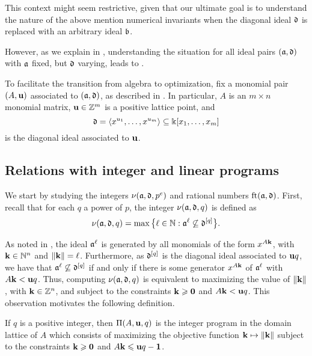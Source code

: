 \documentclass[11pt]{amsart}
\begin{document}
\begin{remark}
This context might seem restrictive, given that our ultimate goal is to understand the nature of the above mention numerical invariants when the diagonal ideal $\mathfrak{d}$ is replaced with an arbitrary ideal $\mathfrak{b}$.  

However, as we explain in , understanding the situation for all ideal pairs $(\mathfrak{a}, \mathfrak{d})$ with $\mathfrak{a}$ fixed, but $\mathfrak{d}$ varying, leads to .
\end{remark}

To facilitate the transition from algebra to optimization, fix a monomial pair $(A, \mathbf{u})$ associated to $(\mathfrak{a}, \mathfrak{d})$, as described in .  In particular, $A$ is an $m \times n$ monomial matrix, $\mathbf{u} \in \mathbb{Z}^m$ is a positive lattice point, and 
\[ \mathfrak{d} = \langle x^{u_1}, \ldots, x^{u_{m}} \rangle \subseteq \Bbbk[x_1, \ldots, x_{m}] \] is the diagonal ideal associated to $\mathbf{u}$.

\subsection{Relations with integer and linear programs}  We start by studying the integers $\nu(\mathfrak{a}, \mathfrak{d}, p^e)$ and rational numbers $\operatorname{ft}(\mathfrak{a}, \mathfrak{d})$.  First, recall that for each $q$ a power of $p$, the integer $\nu(\mathfrak{a}, \mathfrak{d}, q)$ is defined as 
\[\nu(\mathfrak{a},\mathfrak{d},q) = \max\big\{\ell \in \mathbb{N} : \mathfrak{a}^{\ell} \not\subseteq \mathfrak{d}^{[q]}\big\}.\]

As noted in ,  the ideal $\mathfrak{a}^{\ell}$ is generated by all monomials of the form $x^{A\mathbf{k}}$, with $\mathbf{k}\in \mathbb{N}^n$ and $\| \mathbf{k} \| = \ell$.  Furthermore, as $\mathfrak{d}^{[q]}$ is the diagonal ideal associated to $\mathbf{u}q$, we have that $\mathfrak{a}^{\ell} \not\subseteq \mathfrak{d}^{[q]}$ if and only if there is some generator $x^{A \mathbf{k}}$ of $\mathfrak{a}^{\ell}$ with $A\mathbf{k} < \mathbf{u}q$.  Thus, computing $\nu(\mathfrak{a},\mathfrak{d},q)$ is equivalent to maximizing the value of $\| \mathbf{k} \|$, with $\mathbf{k} \in \mathbb{Z}^n$, and subject to the constraints $\mathbf{k} \geqslant \mathbf{0}$ and $A\mathbf{k} < \mathbf{u}q$.
This observation motivates the following definition.

\begin{definition}
\label{IP: D}
   If $q$ is a positive integer, then $\Pi(A, \mathbf{u}, q)$ is the integer program in the domain lattice of $A$ which consists of maximizing the objective function $\mathbf{k} \mapsto \| \mathbf{k} \|$ subject to the constraints $\mathbf{k} \geqslant \mathbf{0}$ and $A \mathbf{k} \leqslant \mathbf{u}q - \mathbf{1}$.
\end{definition}
\end{document}

